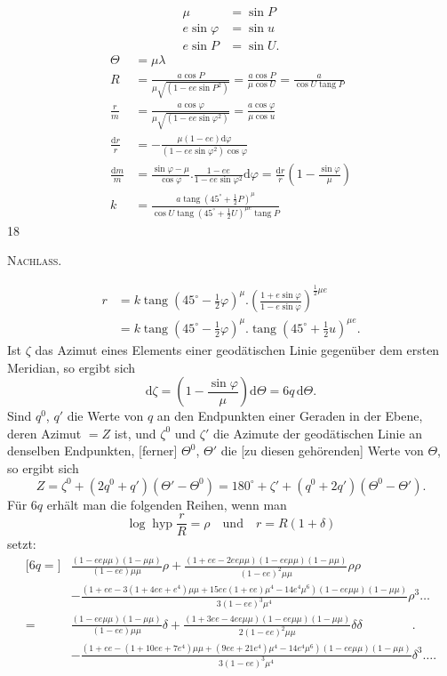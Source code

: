 \[
\begin{aligned}
\mu&=\sin P\\
e\sin\varphi&=\sin u\\
e\sin P&=\sin U.
\end{aligned}
\]
\[
\begin{aligned}
\Theta&=\mu\lambda\\[4pt]
R&=\frac{a\cos P}{\mu\sqrt{(1-ee\sin P^2)}}=\frac{a\cos P}{\mu\cos U}=\frac{a}{\cos U\operatorname{tang}P}\\[5pt]
\frac rm&=\frac{a\cos\varphi}{\mu\sqrt{(1-ee\sin\varphi^2)}}=\frac{a\cos\varphi}{\mu\cos u}\\[5pt]
\frac{\mathrm dr}{r}&=-\frac{\mu(1-ee)\mathrm d\varphi}{(1-ee\sin\varphi^2)\cos\varphi}\\[5pt]
\frac{\mathrm dm}{m}&=\frac{\sin\varphi-\mu}{\cos\varphi}.\frac{1-ee}{1-ee\sin\varphi^2}\mathrm d\varphi=\frac{\mathrm dr}{r}\left(1-\frac{\sin\varphi}{\mu}\right)\\[5pt]
k&=\frac{a\operatorname{tang}(45^\circ+\frac12P)^\mu}{\cos U\operatorname{tang}(45^\circ+\frac12U)^{\mu e}\operatorname{tang}P}
\end{aligned}
\]
\vfill{}\hfill18\hspace*{2cm}\par
\clearpage
{}\hfill\textsc{Nachlass.}\hfill\mbox{}\par\medskip
\[
\begin{aligned}
r&=k\operatorname{tang}(45^\circ-\tfrac12\varphi)^\mu.\left(\frac{1+e\sin\varphi}{1-e\sin\varphi}\right)^{\frac12\mu e}\\
&=k\operatorname{tang}(45^\circ-\tfrac12\varphi)^\mu.\operatorname{tang}(45^\circ+\tfrac12u)^{\mu e}.
\end{aligned}
\]
Ist $\zeta$ das Azimut eines Elements einer geodätischen Linie gegenüber dem ersten Meridian, so ergibt sich
\[
\mathrm d\zeta=\left(1-\frac{\sin\varphi}{\mu}\right)\mathrm d\Theta=6q\,\mathrm d\Theta.
\]
Sind $q^0$, $q'$ die Werte von $q$ an den Endpunkten einer Geraden in der Ebene, deren Azimut $=Z$ ist, und $\zeta^0$ und $\zeta'$ die Azimute der geodätischen Linie an denselben Endpunkten, [ferner] $\Theta^0$, $\Theta'$ die [zu diesen gehörenden] Werte von $\Theta$, so ergibt sich
\[
Z=\zeta^0+(2q^0+q')(\Theta'-\Theta^0)=180^\circ+\zeta'+(q^0+2q')(\Theta^0-\Theta').
\]
Für $6q$ erhält man die folgenden Reihen, wenn man
\[
\log\operatorname{hyp}\frac rR=\rho\quad\text{und}\quad r=R(1+\delta)
\]
setzt:
\begingroup\footnotesize
\[
\begin{aligned}
{[}6q={]}&\frac{(1-ee\mu\mu)(1-\mu\mu)}{(1-ee)\mu\mu}\rho+\frac{(1+ee-2ee\mu\mu)(1-ee\mu\mu)(1-\mu\mu)}{(1-ee)^2\mu\mu}\rho\rho\\
&-\frac{(1+ee-3(1+4ee+e^4)\mu\mu+15ee(1+ee)\mu^4-14e^4\mu^6)(1-ee\mu\mu)(1-\mu\mu)}{3(1-ee)^3\mu^4}\rho^3\ldots\\[5pt]
=&\frac{(1-ee\mu\mu)(1-\mu\mu)}{(1-ee)\mu\mu}\delta+\frac{(1+3ee-4ee\mu\mu)(1-ee\mu\mu)(1-\mu\mu)}{2(1-ee)^2\mu\mu}\delta\delta\qquad\qquad .\\
&-\frac{(1+ee-(1+10ee+7e^4)\mu\mu+(9ee+21e^4)\mu^4-14e^4\mu^6)(1-ee\mu\mu)(1-\mu\mu)}{3(1-ee)^3\mu^4}\delta^3\ldots.
\end{aligned}
\]
